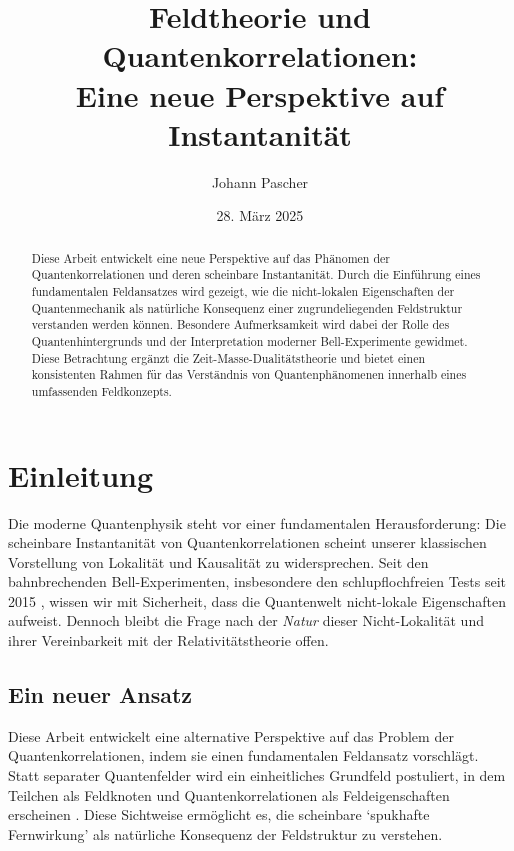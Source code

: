 \documentclass[12pt,a4paper]{article}
\title{Feldtheorie und Quantenkorrelationen: \\ Eine neue Perspektive auf Instantanität}
\author{Johann Pascher}
\date{28. März 2025}
\begin{document}
	
	\maketitle
	
	\begin{abstract}
		Diese Arbeit entwickelt eine neue Perspektive auf das Phänomen der Quantenkorrelationen und deren scheinbare Instantanität. Durch die Einführung eines fundamentalen Feldansatzes wird gezeigt, wie die nicht-lokalen Eigenschaften der Quantenmechanik als natürliche Konsequenz einer zugrundeliegenden Feldstruktur verstanden werden können. Besondere Aufmerksamkeit wird dabei der Rolle des Quantenhintergrunds und der Interpretation moderner Bell-Experimente gewidmet. Diese Betrachtung ergänzt die Zeit-Masse-Dualitätstheorie und bietet einen konsistenten Rahmen für das Verständnis von Quantenphänomenen innerhalb eines umfassenden Feldkonzepts.
	\end{abstract}
	
	\tableofcontents
	\newpage
	
	\section{Einleitung}
	Die moderne Quantenphysik steht vor einer fundamentalen Herausforderung: Die scheinbare Instantanität von Quantenkorrelationen scheint unserer klassischen Vorstellung von Lokalität und Kausalität zu widersprechen. Seit den bahnbrechenden Bell-Experimenten, insbesondere den schlupflochfreien Tests seit 2015 \cite{Hensen2015}, wissen wir mit Sicherheit, dass die Quantenwelt nicht-lokale Eigenschaften aufweist. Dennoch bleibt die Frage nach der \textit{Natur} dieser Nicht-Lokalität und ihrer Vereinbarkeit mit der Relativitätstheorie offen.
	
	\subsection{Ein neuer Ansatz}
	Diese Arbeit entwickelt eine alternative Perspektive auf das Problem der Quantenkorrelationen, indem sie einen fundamentalen Feldansatz vorschlägt. Statt separater Quantenfelder wird ein einheitliches Grundfeld postuliert, in dem Teilchen als Feldknoten und Quantenkorrelationen als Feldeigenschaften erscheinen \cite{Wilczek2008}. Diese Sichtweise ermöglicht es, die scheinbare `spukhafte Fernwirkung' als natürliche Konsequenz der Feldstruktur zu verstehen.
	
\end{document}
